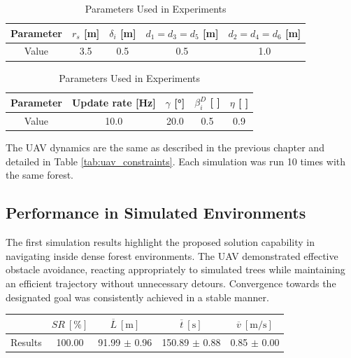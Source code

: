             \begin{table}[H]
                \centering
                \caption{Parameters Used in Experiments}
                
                \begin{tabular}{|c|c|c|c|c|}
                    \hline
                    Parameter & $r_s$ [m]  & $\delta_i$ [m] & $d_1 = d_3 = d_5$ [m] & $d_2 = d_4 = d_6$ [m]   \\ \hline
                    Value & 3.5 & 0.5 & 0.5 & 1.0 \\ \hline
                \end{tabular}
                
                \vspace{0.3cm}
                
                \begin{tabular}{|c|c|c|c|c|}
                    \hline
                    Parameter & Update rate [Hz] & $\gamma$ [°] & $\beta_i^D$ [ ] & $\eta$ [ ] \\ \hline
                    Value & 10.0 & 20.0 & 0.5 & 0.9 \\ \hline
                \end{tabular}
                
                \label{tab:rbl_forest_simulation_parameters}
            \end{table}
            
            The \ac{UAV} dynamics are the same as described in the previous chapter and detailed in Table \ref{tab:uav_constraints}. 
            Each simulation was run 10 times with the same forest. 

        \subsection{Performance in Simulated Environments}
            The first simulation results highlight the proposed solution capability in navigating inside dense forest environments. 
            The \ac{UAV} demonstrated effective obstacle avoidance, reacting appropriately to simulated trees while maintaining an efficient trajectory without unnecessary detours.
            Convergence towards the designated goal was consistently achieved in a stable manner.

            \begin{table}[H]
                \centering
                \renewcommand{\arraystretch}{1.2}
                \begin{tabular}{|c|c|c|c|c|}
                \hline
                                                  & \( SR \ [\%] \) & \( \overline{L} \ [\mathrm{m}] \) & \( \overline{t} \ [\mathrm{s}] \) &  \( \overline{v} \ [\mathrm{m/s}] \)     \\ \hline
                Results                           & 100.00          & 91.99 $\pm$ 0.96                  & 150.89 $\pm$ 0.88                  &  0.85 $\pm$ 0.00                         \\ \hline
                \end{tabular}
            \end{table}

